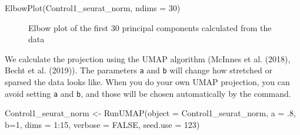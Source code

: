 \documentclass[
  letterpaper,
  DIV=11,
  numbers=noendperiod]{scrartcl}
\newenvironment{Shaded}{}{}
\newcommand{\AttributeTok}[1]{\textcolor[rgb]{0.49,0.56,0.16}{#1}}
\newcommand{\ConstantTok}[1]{\textcolor[rgb]{0.53,0.00,0.00}{#1}}
\newcommand{\DecValTok}[1]{\textcolor[rgb]{0.25,0.63,0.44}{#1}}
\newcommand{\FunctionTok}[1]{\textcolor[rgb]{0.02,0.16,0.49}{#1}}
\newcommand{\NormalTok}[1]{#1}
\newcommand{\OtherTok}[1]{\textcolor[rgb]{0.00,0.44,0.13}{#1}}
\newcommand{\SpecialCharTok}[1]{\textcolor[rgb]{0.25,0.44,0.63}{#1}}
\begin{document}
\begin{Shaded}
\begin{Highlighting}[]
\FunctionTok{ElbowPlot}\NormalTok{(Control1\_seurat\_norm, }\AttributeTok{ndims =} \DecValTok{30}\NormalTok{)}
\end{Highlighting}
\end{Shaded}

\begin{figure}[H]


\caption{\label{fig-elbow}Elbow plot of the first 30 principal
components calculated from the data}

\end{figure}%

We calculate the projection using the UMAP algorithm (McInnes et al.
(2018), Becht et al. (2019)). The parameters \texttt{a} and \texttt{b}
will change how stretched or sparsed the data looks like. When you do
your own UMAP projection, you can avoid setting \texttt{a} and
\texttt{b}, and those will be chosen automatically by the command.

\begin{Shaded}
\begin{Highlighting}[]
\NormalTok{Control1\_seurat\_norm }\OtherTok{\textless{}{-}} \FunctionTok{RunUMAP}\NormalTok{(}\AttributeTok{object =}\NormalTok{ Control1\_seurat\_norm, }
                                         \AttributeTok{a =}\NormalTok{ .}\DecValTok{8}\NormalTok{, }\AttributeTok{b=}\DecValTok{1}\NormalTok{,}
                                         \AttributeTok{dims =} \DecValTok{1}\SpecialCharTok{:}\DecValTok{15}\NormalTok{, }
                                         \AttributeTok{verbose =} \ConstantTok{FALSE}\NormalTok{, }
                                         \AttributeTok{seed.use =} \DecValTok{123}\NormalTok{)}
\end{Highlighting}
\end{Shaded}
\end{document}
